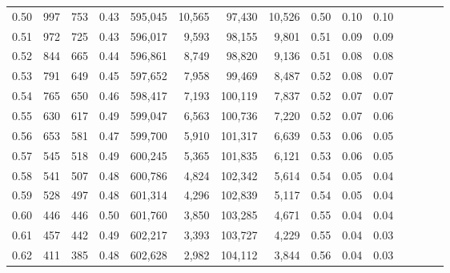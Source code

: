 \begin{tabular}{rrrcrrrrrrrrrrr}
0.50 &     997 &    753 &                                       0.43 &  595,045 &   10,565 &   97,430 &   10,526 &  0.50 &  0.10 &                         0.10 \\
0.51 &     972 &    725 &                                       0.43 &  596,017 &    9,593 &   98,155 &    9,801 &  0.51 &  0.09 &                         0.09 \\
0.52 &     844 &    665 &                                       0.44 &  596,861 &    8,749 &   98,820 &    9,136 &  0.51 &  0.08 &                         0.08 \\
0.53 &     791 &    649 &                                       0.45 &  597,652 &    7,958 &   99,469 &    8,487 &  0.52 &  0.08 &                         0.07 \\
0.54 &     765 &    650 &                                       0.46 &  598,417 &    7,193 &  100,119 &    7,837 &  0.52 &  0.07 &                         0.07 \\
0.55 &     630 &    617 &                                       0.49 &  599,047 &    6,563 &  100,736 &    7,220 &  0.52 &  0.07 &                         0.06 \\
0.56 &     653 &    581 &                                       0.47 &  599,700 &    5,910 &  101,317 &    6,639 &  0.53 &  0.06 &                         0.05 \\
0.57 &     545 &    518 &                                       0.49 &  600,245 &    5,365 &  101,835 &    6,121 &  0.53 &  0.06 &                         0.05 \\
0.58 &     541 &    507 &                                       0.48 &  600,786 &    4,824 &  102,342 &    5,614 &  0.54 &  0.05 &                         0.04 \\
0.59 &     528 &    497 &                                       0.48 &  601,314 &    4,296 &  102,839 &    5,117 &  0.54 &  0.05 &                         0.04 \\
0.60 &     446 &    446 &                                       0.50 &  601,760 &    3,850 &  103,285 &    4,671 &  0.55 &  0.04 &                         0.04 \\
0.61 &     457 &    442 &                                       0.49 &  602,217 &    3,393 &  103,727 &    4,229 &  0.55 &  0.04 &                         0.03 \\
0.62 &     411 &    385 &                                       0.48 &  602,628 &    2,982 &  104,112 &    3,844 &  0.56 &  0.04 &                         0.03 \\

\end{tabular}
